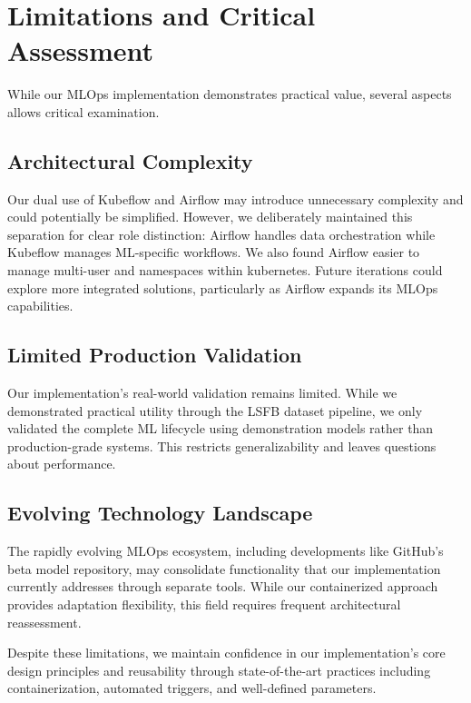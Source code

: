 \section{Limitations and Critical Assessment}\label{sec:limitations-and-critical-assessment}

While our MLOps implementation demonstrates practical value, several aspects allows critical examination.
\subsection*{Architectural Complexity}
Our dual use of Kubeflow and Airflow may introduce unnecessary complexity and could potentially be simplified.
However, we deliberately maintained this separation for clear role distinction: Airflow handles data orchestration while Kubeflow manages ML-specific workflows.
We also found Airflow easier to manage multi-user and namespaces within kubernetes.
Future iterations could explore more integrated solutions, particularly as Airflow expands its MLOps capabilities.

\subsection*{Limited Production Validation}
Our implementation's real-world validation remains limited.
While we demonstrated practical utility through the LSFB dataset pipeline, we only validated the complete ML lifecycle using demonstration models rather than production-grade systems.
This restricts generalizability and leaves questions about performance.
\subsection*{Evolving Technology Landscape}
The rapidly evolving MLOps ecosystem, including developments like GitHub's beta model repository, may consolidate functionality that our implementation currently addresses through separate tools.
While our containerized approach provides adaptation flexibility, this field requires frequent architectural reassessment.

Despite these limitations, we maintain confidence in our implementation's core design principles and reusability through state-of-the-art practices including containerization, automated triggers, and well-defined parameters.

